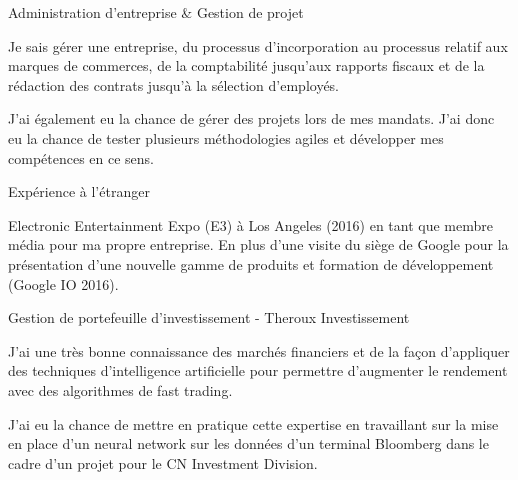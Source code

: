 

\begin{cventries}

  \cventry
    {}
    {Administration d’entreprise \& Gestion de projet}
    {}
    {}
    {
      \begin{cvitems} 
        \item {Je sais gérer une entreprise, du processus d’incorporation au processus relatif aux marques de commerces, de la comptabilité jusqu’aux rapports fiscaux et de la rédaction des contrats jusqu’à la sélection d’employés.}
		\item {J'ai également eu la chance de gérer des projets lors de mes mandats. J'ai donc eu la chance de tester plusieurs méthodologies agiles et développer mes compétences en ce sens.}
      \end{cvitems}
    }

  \cventry
    {}
    {Expérience à l’étranger}
    {}
    {}
    {
      \begin{cvitems}
        \item {Electronic Entertainment Expo (E3) à Los Angeles (2016) en tant que membre média pour ma propre entreprise. En plus d’une visite du siège de Google pour la présentation d’une nouvelle gamme de produits et formation de développement (Google IO 2016).}
      \end{cvitems}
    }

  \cventry
    {}
    {Gestion de portefeuille d’investissement - Theroux Investissement}
    {}
    {}
    {
      \begin{cvitems}
        \item {J’ai une très bonne connaissance des marchés financiers et de la façon d’appliquer des techniques d’intelligence artificielle pour permettre d'augmenter le rendement avec des algorithmes de fast trading.}
		\item {J’ai eu la chance de mettre en pratique cette expertise en travaillant sur la mise en place d’un neural network sur les données d'un terminal Bloomberg dans le cadre d’un projet pour le CN Investment Division.}
      \end{cvitems}
    }

\end{cventries}
